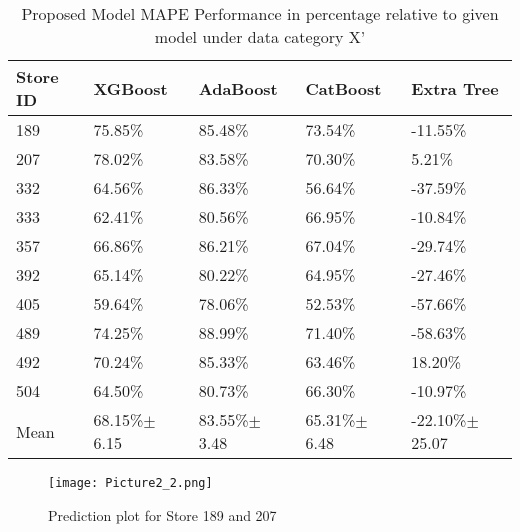 \begin{table*}[]
\centering
\caption{Proposed Model MAPE Performance in percentage relative to given model under data category X'}
\setlength{\tabcolsep}{3pt}
 {\renewcommand{\arraystretch}{1}%
\label{tab:my-table}
\begin{tabular}{p{}p{}p{}p{}p{}}
\hline
\textbf{Store ID} & \textbf{XGBoost}  & \textbf{AdaBoost}  & \textbf{CatBoost}  & \textbf{Extra Tree}  \\ \hline
189          & 75.85\%         & 85.48\%         & 73.54\%          & -11.55\%           \\
207          & 78.02\%        & 83.58\%          & 70.30\%         & 5.21\%          \\
332          & 64.56\%         & 86.33\%          & 56.64\%          & -37.59\%           \\
333          & 62.41\%         & 80.56\%          & 66.95\%          & -10.84\%           \\
357          & 66.86\%        & 86.21\%          & 67.04\%          & -29.74\%           \\
392          & 65.14\%         & 80.22\%          & 64.95\%
          & -27.46\%           \\
405          & 59.64\%         & 78.06\%
          & 52.53\%          & -57.66\%           \\
489          & 74.25\%         & 88.99\%          & 71.40\%          & -58.63\%          \\
492          & 70.24\%         & 85.33\%          & 63.46\%          & 18.20\%           \\
504          & 64.50\%         & 80.73\%          & 66.30\%          & -10.97\%           \\ \hline
Mean             & 68.15\%$\pm$ 6.15  & 83.55\%$\pm$ 3.48   & 65.31\%$\pm$ 6.48   & -22.10\%$\pm$ 25.07    \\ \hline
\end{tabular}%
}
\end{table*}

\begin{figure*}[!h]
 \centering
 \texttt{[image: Picture2\_2.png]}
 \label{}
 \caption{Prediction plot for Store 189 and 207}
\end{figure*}

